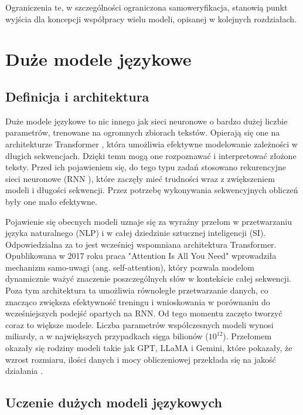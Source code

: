 Ograniczenia te, w szczególności ograniczona samoweryfikacja, stanowią punkt wyjścia dla koncepcji współpracy wielu modeli, opisanej w kolejnych rozdziałach.

\section{Duże modele językowe}

\subsection{Definicja i architektura}

Duże modele językowe to nic innego jak sieci neuronowe o bardzo dużej liczbie parametrów, trenowane na ogromnych zbiorach tekstów. Opierają się one na architekturze Transformer \cite{attention_is_all_you_need}, która umożliwia efektywne modelowanie zależności w długich sekwencjach. Dzięki temu mogą one rozpoznawać i interpretować złożone teksty. Przed ich pojawieniem się, do tego typu zadań stosowano rekurencyjne sieci neuronowe (RNN \cite{fudamentals_of_rnn_and_lstm_network}), które zaczęły mieć trudności wraz z zwiększeniem modeli i długości sekwencji. Przez potrzebę wykonywania sekwencyjnych obliczeń były one mało efektywne.

Pojawienie się obecnych modeli uznaje się za wyraźny przełom w przetwarzaniu języka naturalnego (NLP) i w całej dziedzinie sztucznej inteligencji (SI)\cite{ma_collaboration}. Odpowiedzialna za to jest wcześniej wspomniana architektura Transformer. Opublikowana w 2017 roku praca "Attention Is All You Need" \cite{attention_is_all_you_need} wprowadziła mechanizm samo-uwagi (ang. self-attention), który pozwala modelom dynamicznie ważyć znaczenie poszczególnych słów w kontekście całej sekwencji. Poza tym architektura ta umożliwia równoległe przetwarzanie danych, co znacząco zwiększa efektywność treningu i wnioskowania w porównaniu do wcześniejszych podejść opartych na RNN. Od tego momentu zaczęto tworzyć coraz to większe modele. Liczba parametrów współczesnych modeli wynosi miliardy, a w największych przypadkach sięga bilionów ($10^{12}$). Przełomem okazały się rodziny modeli takie jak GPT, LLaMA i Gemini, które pokazały, że wzrost rozmiaru, ilości danych i mocy obliczeniowej przekłada się na jakość działania \cite{ma_collaboration}.

\subsection{Uczenie dużych modeli językowych}

